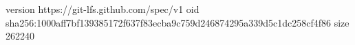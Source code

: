 version https://git-lfs.github.com/spec/v1
oid sha256:1000aff7bf139385172f637f83ecba9c759d246874295a339d5c1dc258cf4f86
size 262240
